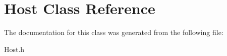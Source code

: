 \hypertarget{class_host}{\section{Host Class Reference}
\label{class_host}
}


The documentation for this class was generated from the following file\-:\begin{DoxyCompactItemize}
\item 
Host.\-h\end{DoxyCompactItemize}
